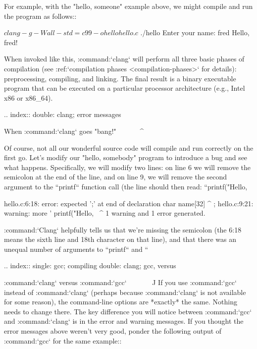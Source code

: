 For example, with the "hello, someone" example above, we might compile and run the program as follows::

    $ clang -g -Wall -std=c99 -o hello hello.c
    $ ./hello
    Enter your name: fred
    Hello, fred!

When invoked like this, :command:`clang` will perform all three basic phases of compilation (see :ref:`compilation phases <compilation-phases>` for details): preprocessing, compiling, and linking.  The final result is a binary executable program that can be executed on a particular processor architecture (e.g., Intel x86 or x86_64).  

.. index:: 
   double: clang; error messages

When :command:`clang` goes "bang!"
^^^^^^^^^^^^^^^^^^^^^^^^^^^^^^^^^^

Of course, not all our wonderful source code will compile and run correctly on the first go.  Let's modify our "hello, somebody" program to introduce a bug and see what happens.  Specifically, we will modify two lines: on line 6 we will remove the semicolon at the end of the line, and on line 9, we will remove the second argument to the ``printf`` function call (the line should then read: ``printf("Hello, %

    hello.c:6:18: error: expected ';' at end of declaration
        char name[32]
                     ^
                     ;
    hello.c:9:21: warning: more '%
        printf("Hello, %
                       ~^
    1 warning and 1 error generated.    

:command:`Clang` helpfully tells us that we're missing the semicolon (the 6:18 means the sixth line and 18th character on that line), and that there was an unequal number of arguments to ``printf`` and ``%


.. index::
   single: gcc; compiling
   double: clang; gcc, versus

:command:`clang` versus :command:`gcc`
^^^^^^^^^^^^^^^^^^^^^^^^^^^^^^^^^^^^^^

If you use :command:`gcc` instead of :command:`clang` (perhaps because :command:`clang` is not available for some reason), the command-line options are *exactly* the same.  Nothing needs to change there.  The key difference you will notice between :command:`gcc` and :command:`clang` is in the error and warning messages.  If you thought the error messages above weren't very good, ponder the following output of :command:`gcc` for the same example::

